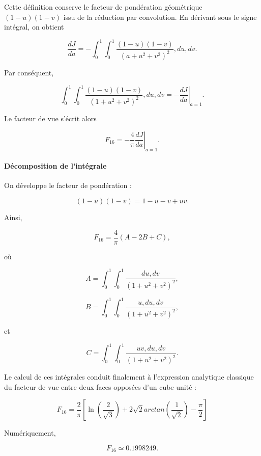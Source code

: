 Cette définition conserve le facteur de pondération géométrique $(1-u)(1-v)$ issu de la réduction par convolution. En dérivant sous le signe intégral, on obtient

\begin{equation}
\frac{dJ}{da}=-\int_0^1\int_0^1\frac{(1-u)(1-v)}{(a+u^2+v^2)^2},du,dv.
\end{equation}

Par conséquent,

\begin{equation}
\int_0^1\int_0^1\frac{(1-u)(1-v)}{(1+u^2+v^2)^2},du,dv=-\left.\frac{dJ}{da}\right|_{a=1}.
\end{equation}

Le facteur de vue s'écrit alors

\begin{equation}
F_{16}=-\frac{4}{\pi}\left.\frac{dJ}{da}\right|_{a=1}.
\end{equation}

\paragraph{Décomposition de l'intégrale}

On développe le facteur de pondération :

\begin{equation}
(1-u)(1-v)=1-u-v+uv.
\end{equation}

Ainsi,

\begin{equation}
F_{16}=\frac{4}{\pi}(A-2B+C),
\end{equation}

où

\begin{equation}
A=\int_0^1\int_0^1\frac{du,dv}{(1+u^2+v^2)^2},
\end{equation}

\begin{equation}
B=\int_0^1\int_0^1\frac{u,du,dv}{(1+u^2+v^2)^2},
\end{equation}

et

\begin{equation}
C=\int_0^1\int_0^1\frac{uv,du,dv}{(1+u^2+v^2)^2}.
\end{equation}

Le calcul de ces intégrales conduit finalement à l'expression analytique classique du facteur de vue entre deux faces opposées d'un cube unité :

\begin{equation}
F_{16}=\frac{2}{\pi} \left[ \ln(\frac{2}{\sqrt{3}}) +2\sqrt{2}arctan(\frac{1}{\sqrt{2}})-\frac{\pi}{2} \right]
\end{equation}

Numériquement,

\begin{equation}
F_{16}\simeq 0.1998249.
\end{equation}